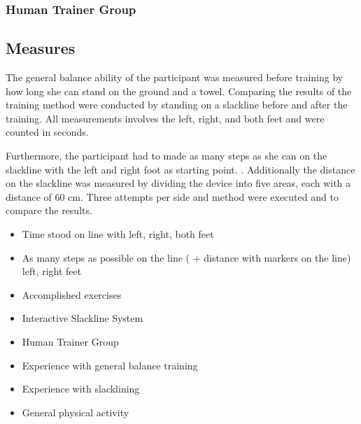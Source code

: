 \subsubsection{Human Trainer Group}

\subsection{Measures}
The general balance ability of the participant was measured before training by how long she can stand on the ground and a towel. Comparing the results of the training method were conducted by standing on a slackline before and after the training. All measurements involves the left, right, and both feet and were counted in seconds. 

Furthermore, the participant had to made as many steps as she can on the slackline with the left and right foot as starting point. . Additionally the distance on the slackline was measured by dividing the device into five areas, each with a distance of 60 cm. Three attempts per side and method were executed and  to compare the results.

\begin{itemize}
\item Time stood on line with left, right, both feet
\item As many steps as possible on the line ( + distance with markers on the line) left, right feet
\item Accomplished exercises
\end{itemize}

\begin{itemize}
\item Interactive Slackline System
\item Human Trainer Group
\end{itemize}

\begin{itemize}
\item Experience with general balance training
\item Experience with slacklining
\item General physical activity
\end{itemize}


